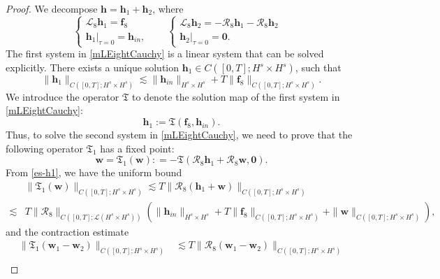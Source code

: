 \documentclass[12pt]{amsart}
\theoremstyle{remark}
\theoremstyle{definition}
\numberwithin{equation}{section}
\newcommand{\mL}{\mathcal{L}}
\newcommand{\mR}{\mathcal{R}}
\begin{document}
\begin{proof}
We decompose $\mathbf{h} = \mathbf{h}_1+ \mathbf{h}_2$, where
\begin{equation} \label{mLEightCauchy}
\left\{
\begin{array}{lr}
\mL_8 \mathbf{h}_1 = \mathbf{f}_8 &  \\
\mathbf{h}_1|_{\tau=0} = \mathbf{h}_{in},&
\end{array}
\right. \quad
\left\{
\begin{array}{lr}
\mL_8 \mathbf{h}_2 = -\mR_8 \mathbf{h}_1 -\mR_8 \mathbf{h}_2 &  \\
\mathbf{h}_2|_{\tau=0} = \mathbf{0}.&
\end{array}
\right.
\end{equation}
The first system in \eqref{mLEightCauchy} is a linear system that can be solved explicitly.
There exists a unique solution $\mathbf{h}_1\in C([0,T]; H^s\times H^s)$, such that
\begin{equation}\label{es-h1}
 \| \mathbf{h}_1\|_{C([0,T]; H^s\times H^s)} \lesssim \|\mathbf{h}_{in} \|_{H^s\times H^s} + T\| \mathbf{f}_8\|_{C([0,T]; H^s\times H^s)}.
\end{equation}
We introduce the operator $\mathfrak{T}$ to denote the solution map of the first system in \eqref{mLEightCauchy}:
\begin{equation*}
\mathbf{h}_1:=\mathfrak{T}(\mathbf{f}_8,\mathbf{h}_{in}).
\end{equation*}
Thus, to solve the second system in \eqref{mLEightCauchy}, we need to prove that the following operator $\mathfrak{T}_1$ has a fixed point:
\begin{equation*}
\mathbf{w}= \mathfrak{T}_1(\mathbf{w}): =-\mathfrak{T}(\mathcal{R}_8\mathbf{h}_1+\mathcal{R}_8\mathbf{w},\mathbf{0}).
\end{equation*}
From \eqref{es-h1}, we have the uniform bound
\begin{align*}
&\|\mathfrak{T}_1(\mathbf{w})\|_{C([0,T]; H^s\times H^s)}\lesssim T\| \mathcal{R}_8(\mathbf{h}_1+\mathbf{w})\|_{C([0,T]; H^s\times H^s)}\\
\lesssim &T\|\mR_8\|_{C([0,T]; \mL (H^s\times H^s))}\left(\|\mathbf{h}_{in} \|_{H^s\times H^s} + T\| \mathbf{f}_8\|_{C([0,T]; H^s\times H^s)}+\| \mathbf{w}\|_{C([0,T]; H^s\times H^s)}\right), 
\end{align*}
and the contraction estimate
\begin{align*}
\|\mathfrak{T}_1(\mathbf{w}_1-\mathbf{w}_2)\|_{C([0,T]; H^s\times H^s)}&\lesssim T\| \mathcal{R}_8(\mathbf{w}_1-\mathbf{w}_2)\|_{C([0,T]; H^s\times H^s)}\\

\end{align*}
\end{proof}
\end{document}

